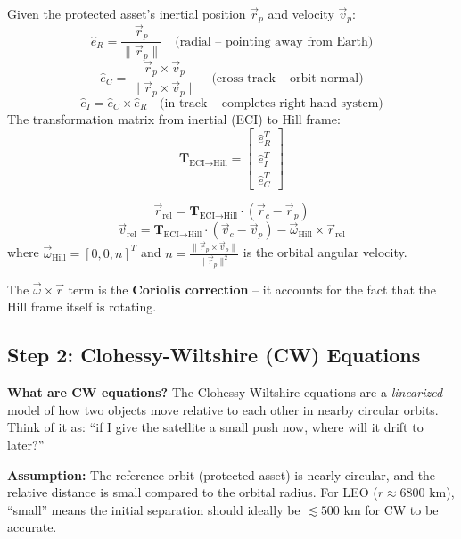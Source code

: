 \documentclass[12pt,a4paper]{article}
\begin{document}
\begin{formulabox}[title=Formula: Hill Frame Basis Vectors]
Given the protected asset's inertial position $\vec{r}_p$ and velocity $\vec{v}_p$:
\[
\hat{e}_R = \frac{\vec{r}_p}{\|\vec{r}_p\|} \quad \text{(radial -- pointing away from Earth)}
\]
\[
\hat{e}_C = \frac{\vec{r}_p \times \vec{v}_p}{\|\vec{r}_p \times \vec{v}_p\|} \quad \text{(cross-track -- orbit normal)}
\]
\[
\hat{e}_I = \hat{e}_C \times \hat{e}_R \quad \text{(in-track -- completes right-hand system)}
\]
The transformation matrix from inertial (ECI) to Hill frame:
\[
\mathbf{T}_{\text{ECI}\to\text{Hill}} = \begin{bmatrix} \hat{e}_R^T \\ \hat{e}_I^T \\ \hat{e}_C^T \end{bmatrix}
\]
\end{formulabox}

\begin{formulabox}[title=Formula: Relative State in Hill Frame]
\[
\vec{r}_{\text{rel}} = \mathbf{T}_{\text{ECI}\to\text{Hill}} \cdot (\vec{r}_c - \vec{r}_p)
\]
\[
\vec{v}_{\text{rel}} = \mathbf{T}_{\text{ECI}\to\text{Hill}} \cdot (\vec{v}_c - \vec{v}_p) - \vec{\omega}_{\text{Hill}} \times \vec{r}_{\text{rel}}
\]
where $\vec{\omega}_{\text{Hill}} = [0, 0, n]^T$ and $n = \frac{\|\vec{r}_p \times \vec{v}_p\|}{\|\vec{r}_p\|^2}$ is the orbital angular velocity.

The $\vec{\omega} \times \vec{r}$ term is the \textbf{Coriolis correction} -- it accounts for the fact that the Hill frame itself is rotating.
\end{formulabox}

\subsection{Step 2: Clohessy-Wiltshire (CW) Equations}

\textbf{What are CW equations?}
The Clohessy-Wiltshire equations are a \textit{linearized} model of how two objects move relative to each other in nearby circular orbits. Think of it as: ``if I give the satellite a small push now, where will it drift to later?''

\textbf{Assumption:} The reference orbit (protected asset) is nearly circular, and the relative distance is small compared to the orbital radius. For LEO ($r \approx 6800$ km), ``small'' means the initial separation should ideally be $\lesssim 500$ km for CW to be accurate.
\end{document}
